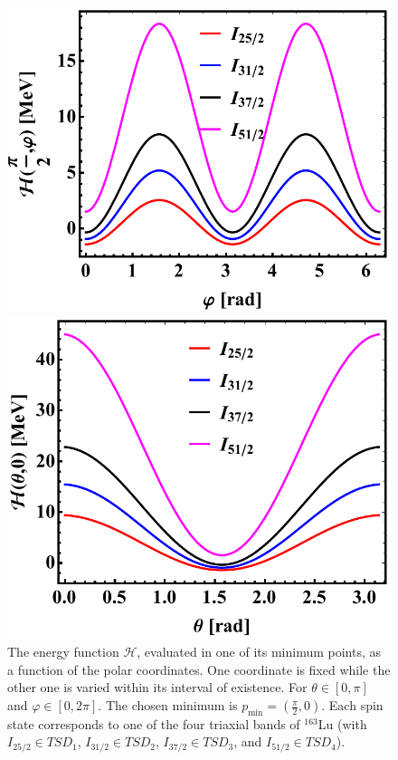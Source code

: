 \documentclass[myclassdoc,debug]{rjparticle}
\begin{document}
\begin{figure}
\centering
\begin{minipage}{.5\textwidth}
  \centering
  \includegraphics[scale=0.48]{figs/energyFunction_minTheta.pdf}
\end{minipage}%
\begin{minipage}{.5\textwidth}
  \centering
 \includegraphics[scale=0.45]{figs/energyFunction_minVarphi.pdf}
\end{minipage}
\caption{The energy function $\mathcal{H}$, evaluated in one of its minimum points, as a function of the polar coordinates. One coordinate is fixed while the other one is varied within its interval of existence. For $\theta\in[0,\pi]$ and $\varphi\in[0,2\pi]$. The chosen minimum is $p_\text{min}=\left(\frac{\pi}{2},0\right)$. Each spin state corresponds to one of the four triaxial bands of $^{163}$Lu (with $I_{25/2}\in TSD_1$, $I_{31/2}\in TSD_2$, $I_{37/2}\in TSD_3$, and $I_{51/2}\in TSD_4$).}
    \label{energy-function-min-point-evolution}
\end{figure}
\end{document}
